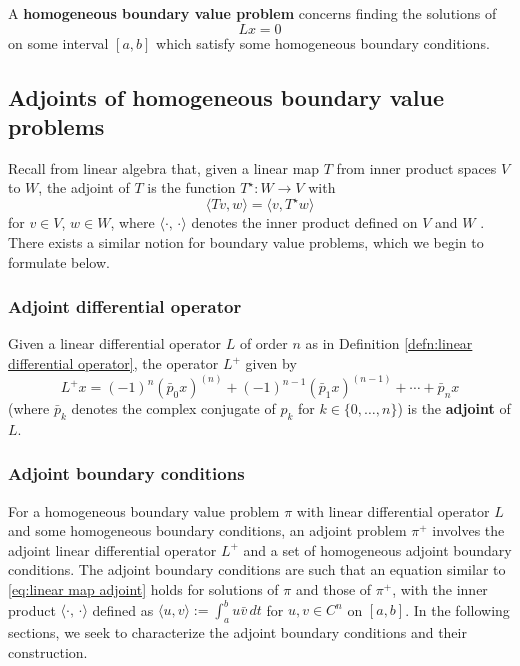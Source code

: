 \documentclass[12pt, oneside, a4paper]{article}
\begin{document}
\begin{defn}\cite[p.284]{CoddingtonLevinson}\label{defn:homogeneous boundary value problem}
    A \textbf{homogeneous boundary value problem} concerns finding the solutions of 
    \[Lx=0\] on some interval $[a,b]$ which satisfy some homogeneous boundary conditions.
\end{defn}

\subsection{Adjoints of homogeneous boundary value problems}\label{sec:adjoints_of_homogeneous_BVPs}

Recall from linear algebra that, given a linear map $T$ from inner product spaces $V$ to $W$, the adjoint of $T$ is the function $T^\star:W\to V$ with
\begin{equation}\label{eq:linear map adjoint}
    \langle Tv, w\rangle = \langle v, T^\star w\rangle
\end{equation}
for $v\in V$, $w\in W$, where $\langle \cdot,\,\cdot \rangle$ denotes the inner product defined on $V$ and $W$ \cite[p.204]{Axler1997}. There exists a similar notion for boundary value problems, which we begin to formulate below.

\subsubsection{Adjoint differential operator}
\begin{defn}\cite[p.84]{CoddingtonLevinson}\label{defn:adjoint linear differential operator}
    Given a linear differential operator $L$ of order $n$ as in Definition \ref{defn:linear differential operator}, the operator $L^+$ given by
    \[L^+x = (-1)^n (\bar{p}_0 x)^{(n)} + (-1)^{n-1}(\bar{p}_1 x)^{(n-1)} +\cdots +\bar{p}_nx\]
    (where $\bar{p}_k$ denotes the complex conjugate of $p_k$ for $k\in\{0,\ldots,n\}$) is the \textbf{adjoint} of $L$.
\end{defn}

\subsubsection{Adjoint boundary conditions}
For a homogeneous boundary value problem $\pi$ with linear differential operator $L$ and some homogeneous boundary conditions, an adjoint problem $\pi^+$ involves the adjoint linear differential operator $L^+$ and a set of homogeneous adjoint boundary conditions. The adjoint boundary conditions are such that an equation similar to \eqref{eq:linear map adjoint} holds for solutions of $\pi$ and those of $\pi^+$, with the inner product $\langle\cdot,\,\cdot\rangle$ defined as $\langle u,v\rangle := \int_a^b u\bar{v}\,dt$ for $u, v\in C^n$ on $[a,b]$. In the following sections, we seek to characterize the adjoint boundary conditions and their construction.
\end{document}
